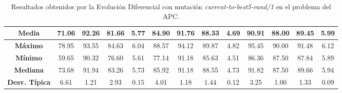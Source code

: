 \documentclass[11pt,a4paper]{article}
\begin{document}
\begin{table}[H]
{\begin{tabular}{c|c|c|c|c|c|c|c|c|c|c|c|c|}
\multicolumn{1}{|c|}{\textbf{Media}}        & 71.06                      & 92.26                   & 81.66                  & 5.77       & 84.90                      & 91.76                   & 88.33                  & 4.69       & 90.91                      & 88.00                   & 89.45                  & 5.99       \\ \hline
\multicolumn{1}{|c|}{\textbf{Máximo}}       & 78.95                      & 93.55                   & 84.63                  & 6.04       & 88.57                      & 94.12                   & 89.87                  & 4.82       & 95.45                      & 90.00                   & 91.48                  & 6.12       \\ \hline
\multicolumn{1}{|c|}{\textbf{Mínimo}}       & 59.65                      & 90.32                   & 76.60                  & 5.61       & 77.14                      & 91.18                   & 85.63                  & 4.51       & 86.36                      & 87.50                   & 87.84                  & 5.89       \\ \hline
\multicolumn{1}{|c|}{\textbf{Mediana}}      & 73.68                      & 91.94                   & 83.26                  & 5.73       & 85.92                      & 91.18                   & 88.55                  & 4.73       & 91.82                      & 87.50                   & 89.66                  & 5.94       \\ \hline
\multicolumn{1}{|c|}{\textbf{Desv. Típica}} & 6.61                       & 1.21                    & 2.93                   & 0.15       & 4.01                       & 1.18                    & 1.44                   & 0.12       & 3.25                       & 1.00                    & 1.33                   & 0.09       \\ \hline
\end{tabular}
}%
\caption{Resultados obtenidos por la Evolución Diferencial con mutación \textit{current-to-best5-rand/1} en el problema del APC.}
\end{table}
\end{document}
